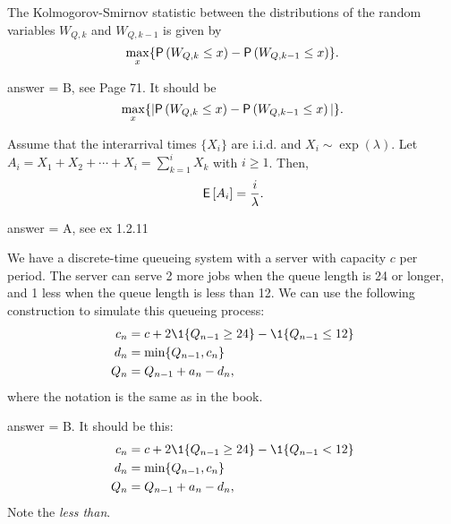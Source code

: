 \begin{exercise}[201803]
The Kolmogorov-Smirnov statistic between the distributions of the random variables $W_{Q,k}$ and $W_{Q,k-1}$ is given by
\begin{equation*}
  \max_x\{ \P{W_{Q,k}\leq x} - \P{W_{Q,k-1}\leq x}\}.
\end{equation*}

\begin{solution}
answer = B, see Page 71. It should be
\begin{equation*}
  \max_x\{|\P{W_{Q,k}\leq x} - \P{W_{Q,k-1}\leq x}|\}.
\end{equation*}

\end{solution}
\end{exercise}


\begin{exercise}[201804]
    Assume that the interarrival times $\{X_i\}$ are i.i.d. and
    $X_i\sim\exp(\lambda)$. Let
    $A_i=X_1+X_2+\cdots+X_i=\sum_{k=1}^i X_k$ with $i\geq 1$. Then,
 \begin{equation*}
\,\mathsf{E}\left[A_i\right] = \frac i\lambda.
 \end{equation*}
\begin{solution}
answer = A, see ex 1.2.11
\end{solution}
\end{exercise}

\begin{exercise}[201804]
We have a discrete-time queueing system with a server with capacity $c$ per period. The server can serve 2 more jobs
when the queue length is 24 or longer, and  1 less when the queue length is less than 12.  
We can use the following construction  to simulate this queueing process:
\begin{align*}
c_n &= c + 2\1{Q_{n-1} \geq 24} - \1{Q_{n-1} \leq 12}\\
  d_n &= \min\{Q_{n-1}, c_n\} \\
Q_n &= Q_{n-1} + a_n - d_n,
\end{align*}
where the notation is the same as in the book.
\begin{solution}
answer = B. It should be this:
\begin{align*}
c_n &= c + 2\1{Q_{n-1} \geq 24} - \1{Q_{n-1} < 12}\\
  d_n &= \min\{Q_{n-1}, c_n\} \\
Q_n &= Q_{n-1} + a_n - d_n,
\end{align*}
Note the \emph{less than}.
\end{solution}
\end{exercise}

